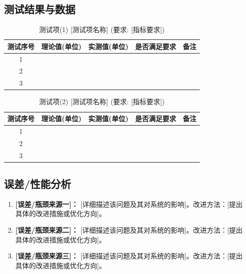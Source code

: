 \documentclass[UTF8,zihao=-4]{ctexart}
\begin{document}
\subsection{测试结果与数据}
    \begin{table}[H]
        \centering
        \caption{测试项(1) [测试项名称] (要求: [指标要求])}
        \label{tab:task1}
        \begin{tabular}{ccccc}
            \toprule
            测试序号 & 理论值(单位) & 实测值(单位) & 是否满足要求 & 备注 \\
            \midrule
            1 & & & & \\
            2 & & & & \\
            3 & & & & \\
            \bottomrule
        \end{tabular}
    \end{table}

    \begin{table}[H]
        \centering
        \caption{测试项(2) [测试项名称] (要求: [指标要求])}
        \label{tab:task2}
        \begin{tabular}{ccccc}
            \toprule
            测试序号 & 理论值(单位) & 实测值(单位) & 是否满足要求 & 备注 \\
            \midrule
            1 & & & & \\
            2 & & & & \\
            3 & & & & \\
            \bottomrule
        \end{tabular}
    \end{table}
    

\subsection{误差/性能分析}
    \begin{enumerate}
        \item \textbf{[误差/瓶颈来源一]：} [详细描述该问题及其对系统的影响]。改进方法：[提出具体的改进措施或优化方向]。
        \item \textbf{[误差/瓶颈来源二]：} [详细描述该问题及其对系统的影响]。改进方法：[提出具体的改进措施或优化方向]。
        \item \textbf{[误差/瓶颈来源三]：} [详细描述该问题及其对系统的影响]。改进方法：[提出具体的改进措施或优化方向]。
    \end{enumerate}
\end{document}
